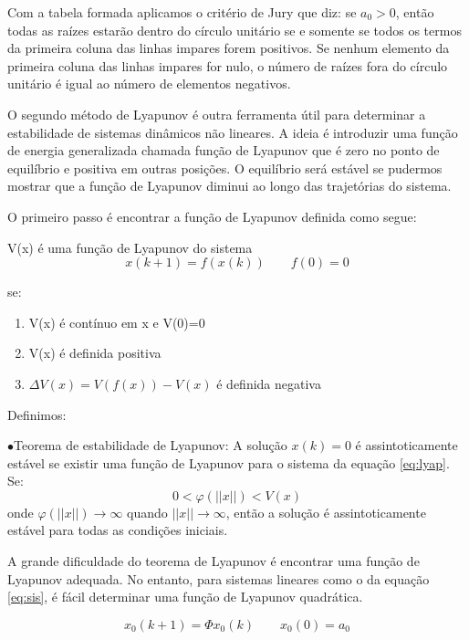 Com a tabela formada aplicamos o critério de Jury que diz: se $a_0>0$, então todas as raízes estarão dentro do círculo unitário se e somente se todos os termos da primeira coluna das linhas impares forem positivos. Se nenhum elemento da primeira coluna das linhas impares for nulo, o número  de raízes fora do círculo unitário é igual ao número de elementos negativos.

O segundo método de Lyapunov é outra ferramenta útil para determinar a estabilidade de sistemas dinâmicos não lineares. A ideia é introduzir uma função de energia generalizada chamada função de Lyapunov que é zero no ponto de equilíbrio e positiva em outras posições. O equilíbrio será estável se pudermos mostrar que a função de Lyapunov diminui ao longo das trajetórias do sistema.


O primeiro passo é encontrar a função de Lyapunov definida como segue:


V(x) é uma função de Lyapunov do sistema
\begin{equation}\label{eq:lyap}
x(k+1)=f(x(k)) \qquad f(0)=0
\end{equation}

se:
\begin{enumerate}
	\item V(x) é contínuo em x e V(0)=0
	\item V(x) é definida positiva
	\item $\Delta V(x)=V(f(x))-V(x)$ é definida negativa
\end{enumerate}

Definimos:


$\bullet$Teorema de estabilidade de Lyapunov: A solução $x(k)=0$ é assintoticamente estável se existir uma função de Lyapunov para o sistema da equação \eqref{eq:lyap}. Se:
\begin{equation}
0<\varphi(||x||)<V(x)
\end{equation}
onde $\varphi(||x||)\to \infty$ quando $||x|| \to \infty$, então a solução é assintoticamente estável para todas as condições iniciais.


A grande dificuldade do teorema de Lyapunov é encontrar uma função de Lyapunov adequada. No entanto, para sistemas lineares como o da equação \eqref{eq:sis}, é fácil determinar uma função de Lyapunov quadrática.

\begin{equation} \label{eq:sis}
x_0(k+1)=\Phi x_0(k) \qquad x_0(0)=a_0
\end{equation}

